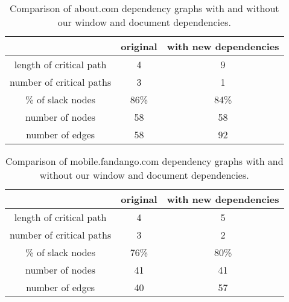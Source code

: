 \begin{table*}[tb]
\centering
\small
\begin{tabular}{|c|c|c|}
\hline
 & original & with new dependencies \\
\hline
length of critical path & 4 & 9 \\
number of critical paths & 3 & 1 \\
\% of slack nodes & 86\% & 84\% \\
number of nodes & 58 & 58 \\
number of edges & 58 & 92 \\
\hline
\end{tabular}\caption{Comparison of about.com dependency graphs with and without our window and document dependencies.}
\label{t:aboutgraph}
\end{table*}


\begin{table*}[tb]
\centering
\small
\begin{tabular}{|c|c|c|}
\hline
 & original & with new dependencies \\
\hline
length of critical path & 4 & 5 \\
number of critical paths & 3 & 2 \\
\% of slack nodes & 76\% & 80\% \\
number of nodes & 41 & 41 \\
number of edges & 40 & 57 \\
\hline
\end{tabular}\caption{Comparison of mobile.fandango.com dependency graphs with and without our window and document dependencies.}
\label{t:fandangograph}
\end{table*}
